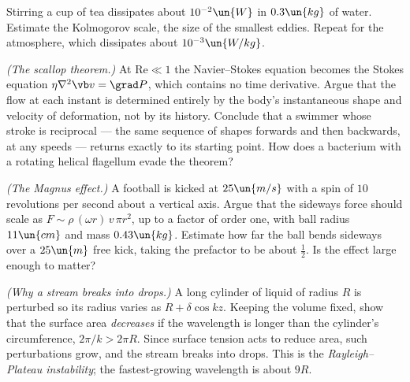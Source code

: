 \begin{problems}
 Stirring a cup of tea dissipates about $10^{-2}\un{W}$ in $0.3\un{kg}$ of water. Estimate the Kolmogorov scale, the size of the smallest eddies. Repeat for the atmosphere, which dissipates about $10^{-3}\un{W/kg}$.

\core \label{prob:scallop} \emph{(The scallop theorem.)} At $\mathrm{Re}\ll1$ the Navier--Stokes equation becomes the Stokes equation $\eta\nabla^2\vb v = \grad P$, which contains no time derivative. Argue that the flow at each instant is determined entirely by the body's instantaneous shape and velocity of deformation, not by its history. Conclude that a swimmer whose stroke is reciprocal --- the same sequence of shapes forwards and then backwards, at any speeds --- returns exactly to its starting point. How does a bacterium with a rotating helical flagellum evade the theorem?

 \emph{(The Magnus effect.)} A football is kicked at $25\un{m/s}$ with a spin of $10$ revolutions per second about a vertical axis. Argue that the sideways force should scale as $F\sim\rho\,(\omega r)\,v\,\pi r^2$, up to a factor of order one, with ball radius $11\un{cm}$ and mass $0.43\un{kg}$. Estimate how far the ball bends sideways over a $25\un{m}$ free kick, taking the prefactor to be about $\tfrac12$. Is the effect large enough to matter?

 \emph{(Why a stream breaks into drops.)} A long cylinder of liquid of radius $R$ is perturbed so its radius varies as $R + \delta\cos kz$. Keeping the volume fixed, show that the surface area \emph{decreases} if the wavelength is longer than the cylinder's circumference, $2\pi/k > 2\pi R$. Since surface tension acts to reduce area, such perturbations grow, and the stream breaks into drops. This is the \emph{Rayleigh--Plateau instability}; the fastest-growing wavelength is about $9R$.
\end{problems}

\begin{reading}
\end{reading}
